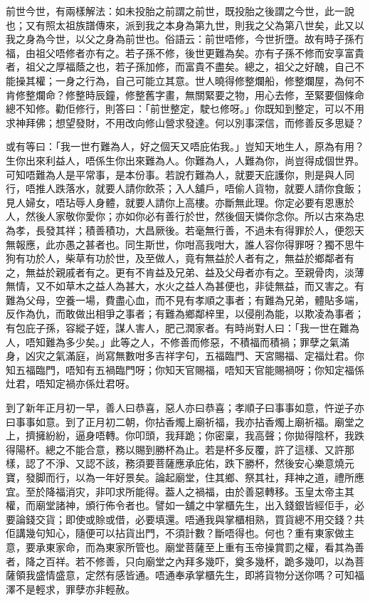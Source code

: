 \documentclass[a5paper, 12pt, openany]{book} %
\begin{document}
	前世今世，有兩樣解法：如未投胎之前謂之前世，既投胎之後謂之今世，此一說也；又有照太祖族譜傳來，派到我之本身為第九世，則我之父為第八世矣，此又以我之身為今世，以父之身為前世也。俗語云：前世唔修，今世折墮。故有時子孫冇福，由祖父唔修者亦有之。若子孫不修，後世更難為矣。亦有子孫不修而安享富貴者，祖父之厚福蔭之也，若子孫加修，而富貴不盡矣。總之，祖父之好醜，自己不能操其權；一身之行為，自己可能立其意。世人曉得修整爛船，修整爛屋，為何不肯修整爛命？修整時辰鐘，修整舊字畫，無關緊要之物，用心去修，至緊要個條命總不知修。勸佢修行，則答曰：「前世整定，駛乜修呀。」你既知到整定，可以不用求神拜佛；想望發財，不用改向修山營求發達。何以別事深信，而修善反多思疑？

	或有等曰：「我一世冇難為人，好之個天又唔庇佑我。」豈知天地生人，原為有用？生你出來利益人，唔係生你出來難為人。你難為人，人難為你，尚豈得成個世界。可知唔難為人是平常事，是本份事。若說冇難為人，就要天庇護你，則是與人同行，唔推人跌落水，就要人請你飲茶；入人舖戶，唔偷人貨物，就要人請你食飯；見人婦女，唔玷辱人身體，就要人請你上高樓。亦斷無此理。你定必要有恩惠於人，然後人家敬你愛你；亦如你必有善行於世，然後個天憐你念你。所以古來為忠為孝，長發其祥；積善積功，大昌厥後。若毫無行善，不過未有得罪於人，便怨天無報應，此亦愚之甚者也。同生斯世，你咁高我咁大，誰人容你得罪呀？獨不思牛狗有功於人，柴草有功於世，及至做人，竟有無益於人者有之，無益於鄉鄰者有之，無益於親戚者有之。更有不肯益及兄弟、益及父母者亦有之。至親骨肉，淡薄無情，又不如草木之益人為甚大，水火之益人為甚便也，非徒無益，而又害之。有難為父母，空養一場，費盡心血，而不見有孝順之事者；有難為兄弟，體貼多端，反作為仇，而敢做出相爭之事者；有難為鄉鄰梓里，以侵削為能，以欺凌為事者；有包庇子孫，容縱子姪，謀人害人，肥己潤家者。有時尚對人曰：「我一世在難為人，唔知難為多少矣。」此等之人，不修善而修惡，不積福而積禍；罪孽之氣滿身，凶灾之氣滿庭，尚寫無數咁多吉祥字句，五福臨門、天宮賜福、定福灶君。你知五福臨門，唔知有五禍臨門呀；你知天官賜福，唔知天官能賜禍呀；你知定福係灶君，唔知定禍亦係灶君呀。

	到了新年正月初一早，善人曰恭喜，惡人亦曰恭喜；孝順子曰事事如意，忤逆子亦曰事事如意。到了正月初二朝，你拈香燭上廟祈福，我亦拈香燭上廟祈福。廟堂之上，擠擁紛紛，逼身唔轉。你叩頭，我拜跪；你密稟，我高聲；你拋得陰杯，我跌得陽杯。總之不能合意，務以賜到勝杯為止。若是杯多反覆，許了這樣、又許那樣，認了不淨、又認不該，務須要菩薩應承庇佑，跌下勝杯，然後安心樂意燒元寶，發脚而行，以為一年好景矣。論起廟堂，住其鄉、祭其社，拜神之道，禮所應宜。至於降福消灾，非叩求所能得。葢人之禍福，由於善惡轉移。玉皇太帝主其權，而廟堂諸神，頒行佈令者也。譬如一舖之中掌櫃先生，出入錢銀皆經佢手，必要論錢交貨；即使或賒或借，必要填還。唔通我與掌櫃相熟，買貨總不用交錢？共佢講幾句知心，隨便可以拈貨出門，不須計數？斷唔得也。何也？重有東家做主意，要承東家命，而為東家所管也。廟堂菩薩至上重有玉帝操賞罰之權，看其為善者，降之百祥。若不修善，只向廟堂之內拜多幾吓，奠多幾杯，跪多幾叩，以為菩薩領我盛情盛意，定然有感皆通。唔通奉承掌櫃先生，即將貨物分送你嗎？可知福澤不是輕求，罪孽亦非輕赦。
\end{document}
